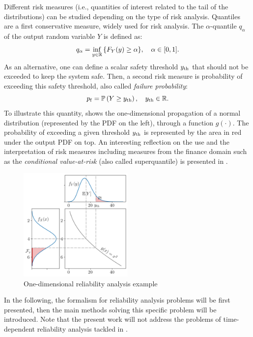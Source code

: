 Different risk measures (i.e., quantities of interest related to the tail of the distributions) can be studied depending on the type of risk analysis. 
Quantiles are a first conservative measure, widely used for risk analysis. 
The $\alpha$-quantile $q_\alpha$ of the output random variable $Y$ is defined as:
\begin{equation}
    q_\alpha = \inf_{y\in\mathbb{R}}{\left\{F_Y(y) \geq \alpha\right\}}, \quad \alpha \in [0, 1].    
\end{equation}
As an alternative, one can define a scalar safety threshold $y_\mathrm{th}$ that should not be exceeded to keep the system safe. 
Then, a second risk measure is probability of exceeding this safety threshold, also called \textit{failure probability}: 
\begin{equation}
    p_\mathrm{f} = \mathbb{P}\left(Y \geq y_\mathrm{th}\right), \quad y_\mathrm{th}\in\mathbb{R}.
    \label{eq:failure_proba}
\end{equation}
To illustrate this quantity,  shows the one-dimensional propagation of a normal distribution (represented by the PDF on the left), through a function $g(\cdot)$.
The probability of exceeding a given threshold $y_\mathrm{th}$ is represented by the area in red under the output PDF on top.
An interesting reflection on the use and the interpretation of risk measures including measures from the finance domain such as the \textit{conditional value-at-risk} (also called superquantile) is presented in \citet{rockafellar_2015}. 

\begin{figure}
    \centering
    \includegraphics[width=0.5\textwidth]{../numerical_experiments/chapter1/figures/1D_reliability.png}
    \caption{One-dimensional reliability analysis example}
    \label{fig:1D_reliability}
\end{figure}

In the following, the formalism for reliability analysis problems will be first presented, 
then the main methods solving this specific problem will be introduced.
Note that the present work will not address the problems of time-dependent reliability analysis tackled in \citet{hawchar_2017}. 

